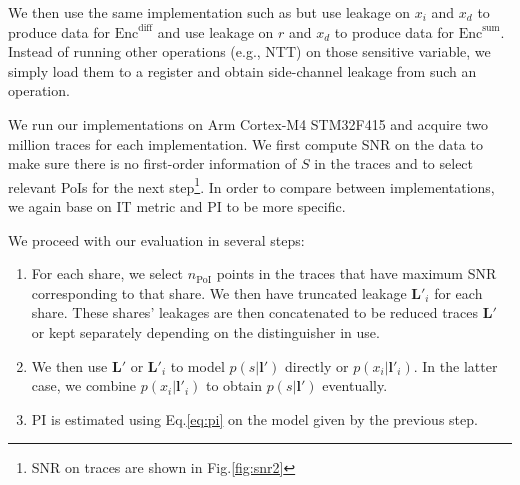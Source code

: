 \documentclass{llncs}
\begin{document}
	We then use the same implementation such as \cite{Kmaskimp0} but use leakage on $x_i$ and $x_d$ to produce data for $\text{Enc}^{\text{diff}}$ and use leakage on $r$ and $x_d$ to produce data for $\text{Enc}^{\text{sum}}$. Instead of running other operations (e.g., NTT) on those sensitive variable, we simply load them to a register and obtain side-channel leakage from such an operation. 
	
	We run our implementations on Arm Cortex-M4 STM32F415 and acquire two million traces for each implementation. We first compute SNR on the data to make sure there is no first-order information of $S$ in the traces and to select relevant PoIs for the next step\footnote{SNR on traces are shown in Fig.\ref{fig:snr2}}. In order to compare between implementations, we again base on IT metric and PI to be more specific.
	
	We proceed with our evaluation in several steps:
	\begin{enumerate}
		\item For each share, we select $n_{\text{PoI}}$ points in the traces that have maximum SNR corresponding to that share. We then have truncated leakage $\bm{L}'_i$ for each share. These shares' leakages are then concatenated to be reduced traces $\bm{L}'$ or kept separately depending on the distinguisher in use.
		\item We then use $\bm{L}'$ or $\bm{L}'_i$ to model $p(s|\bm{l}')$ directly or $p(x_i|\bm{l}'_i)$. In the latter case, we combine $p(x_i|\bm{l}'_i)$ to obtain $p(s|\bm{l}')$ eventually.
		\item PI is estimated using Eq.\ref{eq:pi} on the model given by the previous step.
	\end{enumerate}
	
\end{document}
